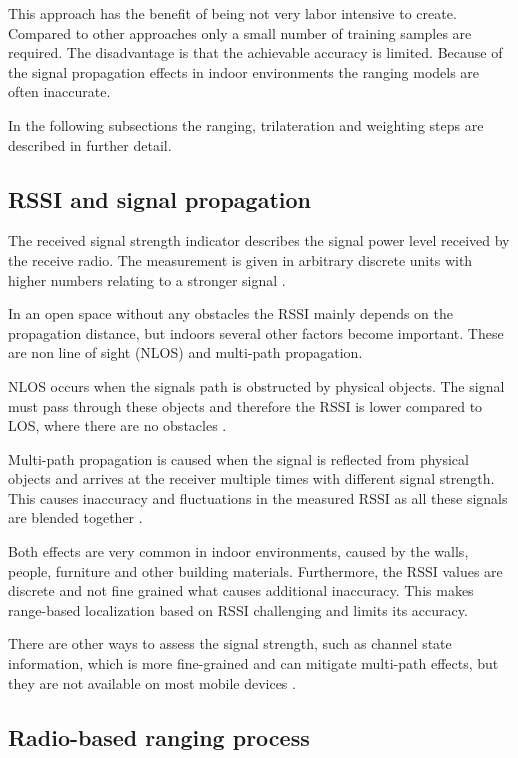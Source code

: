 This approach has the benefit of being not very labor intensive to create. Compared to other approaches only a small number of training samples are required. The disadvantage is that the achievable accuracy is limited. Because of the signal propagation effects in indoor environments the ranging models are often inaccurate.

In the following subsections the ranging, trilateration and weighting steps are described in further detail.

\subsection{RSSI and signal propagation}

The received signal strength indicator describes the signal power level received by the receive radio. The measurement is given in arbitrary discrete units with higher numbers relating to a stronger signal \citep{RSSIwikipedia}.

In an open space without any obstacles the RSSI mainly depends on the propagation distance, but indoors several other factors become important. These are non line of sight (NLOS) and multi-path propagation.

NLOS occurs when the signals path is obstructed by physical objects. The signal must pass through these objects and therefore the RSSI is lower compared to LOS, where there are no obstacles \cite{JoseMaster}.

Multi-path propagation is caused when the signal is reflected from physical objects and arrives at the receiver multiple times with different signal strength. This causes inaccuracy and fluctuations in the measured RSSI as all these signals are blended together \cite{multipathEffects}.

Both effects are very common in indoor environments, caused by the walls, people, furniture and other building materials. Furthermore, the RSSI values are discrete and not fine grained what causes additional inaccuracy. This makes range-based localization based on RSSI challenging and limits its accuracy.

There are other ways to assess the signal strength, such as channel state information, which is more fine-grained and can mitigate multi-path effects, but they are not available on most mobile devices \cite{JoseMaster,FineGrainedIndoorTracking}.

\subsection{Radio-based ranging process}
\label{Ranging}

